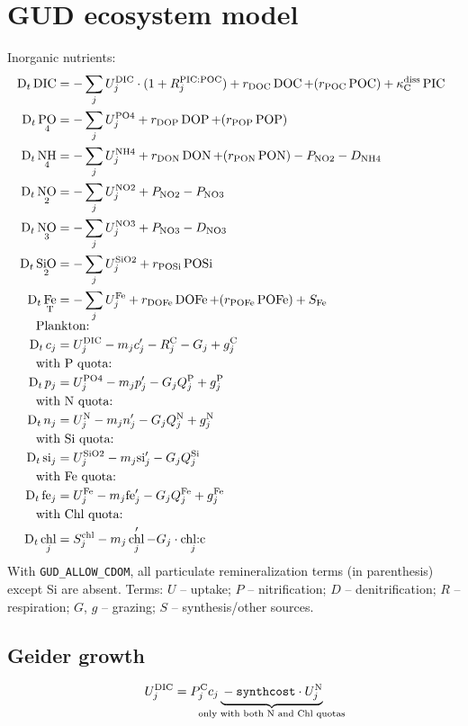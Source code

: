 \documentclass[11pt,letterpaper,english]{article}
\newcommand{\DDt}{\operatorname{D}_t}
\DeclareMathOperator{\DIC}{DIC}
\DeclareMathOperator{\PO}{PO}
\DeclareMathOperator{\Fe}{Fe}
\DeclareMathOperator{\Si}{Si}
\DeclareMathOperator{\SiO}{SiO}
\DeclareMathOperator{\NH}{NH}
\DeclareMathOperator{\NO}{NO}
\DeclareMathOperator{\DOC}{DOC}
\DeclareMathOperator{\DOP}{DOP}
\DeclareMathOperator{\DON}{DON}
\DeclareMathOperator{\DOFe}{DOFe}
\DeclareMathOperator{\POP}{POP}
\DeclareMathOperator{\PON}{PON}
\DeclareMathOperator{\POFe}{POFe}
\DeclareMathOperator{\POSi}{POSi}
\DeclareMathOperator{\PIC}{PIC}
\DeclareMathOperator{\POC}{POC}
\DeclareMathOperator{\chl}{chl}
\DeclareMathOperator{\chlc}{chl\text{:}c}
\DeclareMathOperator{\POiv}{PO4}
\DeclareMathOperator{\NHiv}{NH4}
\DeclareMathOperator{\NOii}{NO2}
\DeclareMathOperator{\NOiii}{NO3}
\DeclareMathOperator{\SiOii}{SiO2}
\newcommand{\N}{\mathrm{N}}
\newcommand{\C}{\mathrm{C}}
\renewcommand{\P}{\mathrm{P}}
\newcommand{\fe}{\mathrm{fe}}
\renewcommand{\si}{\mathrm{si}}
\newcommand{\total}{{\mathrm{T}}}
\newcommand{\FeT}{\Fe_\total}
\newcommand{\PICPOC}{{\text{PIC:POC}}}
\newcommand{\diss}{{\text{diss}}}
\newcommand{\X}{c}
\begin{document}
\section{GUD ecosystem model}

Inorganic nutrients:
\begin{align*}
  \DDt \DIC   &= -\sum_j U^{\DIC}_j \cdot (1 + R^{\PICPOC}_j)
                 + r_{\DOC} \DOC + (r_{\POC} \POC)
                 + \kappa^\diss_\C \PIC \\
  \DDt \PO_4  &= -\sum_j U^{\POiv}_j + r_{\DOP} \DOP + (r_{\POP} \POP) \\
  \DDt \NH_4  &= -\sum_j U^{\NHiv}_j + r_{\DON} \DON + (r_{\PON} \PON) - P_{\NOii}
                                     - D_{\NHiv} \\
  \DDt \NO_2  &= -\sum_j U^{\NOii}_j + P_{\NOii} - P_{\NOiii} \\
  \DDt \NO_3  &= -\sum_j U^{\NOiii}_j + P_{\NOiii} - D_{\NOiii} \\
  \DDt \SiO_2 &= -\sum_j U^{\SiOii}_j + r_{\POSi} \POSi \\
  \DDt \FeT   &= -\sum_j U^{\Fe}_j + r_{\DOFe} \DOFe + (r_{\POFe} \POFe) + S_{\Fe} \\[-1ex]
\noalign{Plankton:}
  \DDt \X_j   &= U^{\DIC}_j - m_j \X'_j - R^\C_j - G_j + g_j^\C \\
\noalign{with P quota:}
  \DDt p_j    &= U^{\POiv}_j - m_j p'_j - G_j Q^\P_j + g_j^\P \\
\noalign{with N quota:}
  \DDt n_j    &= U^{\N}_j - m_j n'_j - G_j Q^\N_j + g_j^\N \\
\noalign{with Si quota:}
  \DDt \si_j  &= U^{\SiOii}_j - m_j \si'_j - G_j Q^{\Si}_j \\
\noalign{with Fe quota:}
  \DDt \fe_j  &= U^{\Fe}_j - m_j \fe'_j - G_j Q^{\Fe}_j + g_j^{\Fe} \\
\noalign{with Chl quota:}
  \DDt \chl_j &= S^{\chl}_j - m_j \chl'_j - G_j \cdot \chlc_j
\end{align*}
With \verb|GUD_ALLOW_CDOM|, all particulate remineralization terms (in parenthesis)
except Si are absent.  Terms: $U$ -- uptake; $P$ -- nitrification;
$D$ -- denitrification; $R$ -- respiration; $G$, $g$ -- grazing;
$S$ -- synthesis/other sources.



\subsection{Geider growth}

\[
  U^{\DIC}_j = P^\C_j \X_j
      \underbrace{{}-{\tt synthcost}\cdot U^\N_j}_{\mathclap{
                      \text{only with both N and Chl quotas}}}
\]
\end{document}

